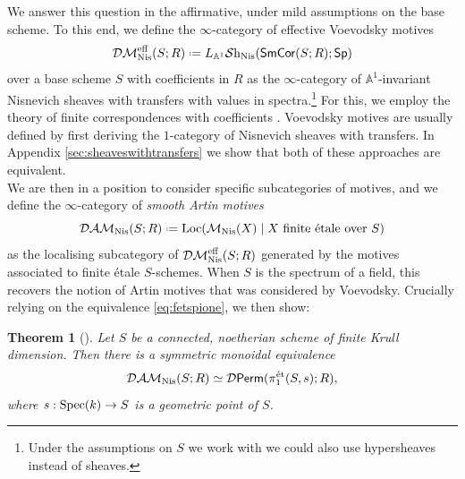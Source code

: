 \documentclass[reqno]{amsart}
\numberwithin{equation}{section}\theoremstyle{thms}
\newtheorem*{thm*}{Theorem}
\theoremstyle{defn}
\newcommand{\bA}{\mathbb{A}}
\newcommand{\cD}{\mathcal{D}}
\newcommand{\cM}{\mathcal{M}}
\newcommand{\tn}[1]{\textnormal{#1}}
\newcommand{\tsf}[1]{\textsf{\textup{#1}}}
\newcommand{\mcal}[1]{\mathcal{#1}}
\newcommand*{\defeq}{\mathrel{\vcenter{\baselineskip0.4ex \lineskiplimit0pt
\hbox{\scriptsize.}\hbox{\scriptsize.}}}%
=}
\newcommand{\sheaves}{\mcal{S}\tn{h}}
\newcommand{\Spec}{\tn{Spec}}
\newcommand{\spec}{\tsf{Sp}}
\newcommand{\corsms}[1]{\tsf{SmCor}(S;#1)}
\begin{document}
\vspace{0.2cm}
We answer this question in the affirmative, under mild assumptions on the base scheme. To this end, we define the $\infty$-category of effective Voevodsky motives 
$$\mcal{DM}_{\tn{Nis}}^{\tn{eff}}(S;R) \defeq L_{\bA^1}\sheaves_{\tn{Nis}}(\corsms{R};\spec)$$
over a base scheme $S$ with coefficients in $R$ as the $\infty$-category of $\bA^1$-invariant Nisnevich sheaves with transfers with values in spectra.\footnote{Under the assumptions on $S$ we work with we could also use hypersheaves instead of sheaves.} For this, we employ the theory of finite correspondences with coefficients \cite[§9]{cd19}. Voevodsky motives are usually defined by first deriving the $1$-category of Nisnevich sheaves with transfers. In Appendix \ref{sec:sheaveswithtransfers} we show that both of these approaches are equivalent. \\
We are then in a position to consider specific subcategories of motives, and we define the $\infty$-category of \emph{smooth Artin motives} 
$$\mcal{DAM}_\tn{Nis}(S;R) \defeq \tn{Loc}(\cM_{\tn{Nis}}(X) \mid X \tn{ finite étale over } S)$$
as the localising subcategory of $\mcal{DM}_\tn{Nis}^{\tn{eff}}(S;R)$ generated by the motives associated to finite étale $S$-schemes. When $S$ is the spectrum of a field, this recovers the notion of Artin motives that was considered by Voevodsky. Crucially relying on the equivalence \ref{eq:fetspione}, we then show:

\begin{thm*}[]
Let $S$ be a connected, noetherian scheme of finite Krull dimension. Then there is a symmetric monoidal equivalence
$$\mcal{DAM}_\tn{Nis}(S;R) \simeq \cD\tsf{Perm}(\pi_1^{\tn{ét}}(S,s);R),$$
where $s: \Spec(k) \to S$ is a geometric point of $S$.
\end{thm*}
\end{document}
